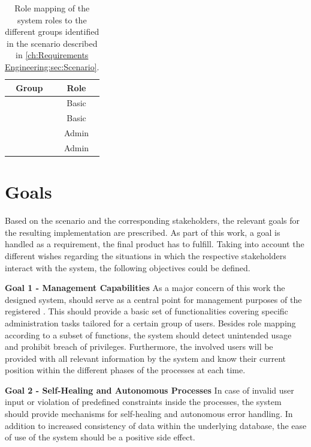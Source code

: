 \begingroup
\setlength{\tabcolsep}{10pt} %
\renewcommand{\arraystretch}{1.5} %
\begin{table}[h]
    \centering
    \caption{Role mapping of the system roles to the different groups identified in the scenario described in \ref{ch:Requirements Engineering:sec:Scenario}.}
    \begin{tabular}{c|c}
        Group & Role \\
        \hline
        \nameref{ch:Requirements Engineering:sec:Stakeholders:ssec:Student} & Basic \\
        \nameref{ch:Requirements Engineering:sec:Stakeholders:ssec:Staff} & Basic \\
        \nameref{ch:Requirements Engineering:sec:Stakeholders:ssec:Staff:sssec:Maintenance Personal} & Admin \\
        \nameref{ch:Requirements Engineering:sec:Stakeholders:ssec:Staff:sssec:Administration} & Admin
    \end{tabular}
    \label{tab:stakeholder-role-mapping}
\end{table}
\endgroup

\section{Goals}
\label{ch:Requirements Engineering:sec:Goals}

Based on the scenario and the corresponding stakeholders, the relevant goals for the resulting implementation are prescribed. As part of this work, a goal is handled as a requirement, the final product has to fulfill. 
Taking into account the different wishes regarding the situations in which the respective stakeholders interact with the system, the following objectives could be defined.

\noindent \textbf{Goal 1 - Management Capabilities} As a major concern of this work the designed system, should serve as a central point for management purposes of the registered . This should provide a basic set of functionalities covering specific administration tasks tailored for a certain group of users. 
Besides role mapping according to a subset of functions, the system should detect unintended usage and prohibit breach of privileges.
Furthermore, the involved users will be provided with all relevant information by the system and know their current position within the different phases of the processes at each time. 

\noindent \textbf{Goal 2 - Self-Healing and Autonomous Processes} In case of invalid user input or violation of predefined constraints inside the processes, the system should provide mechanisms for self-healing and autonomous error handling. 
In addition to increased consistency of data within the underlying database, the ease of use of the system should be a positive side effect.


